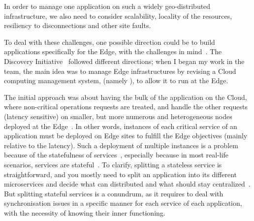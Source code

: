 In order to manage one application on such a widely geo-distributed
infrastructure, we also need to consider scalability, locality of the
resources, resiliency to disconnections and other site faults.


To deal with these challenges, one possible direction could be to
build applications specifically for the Edge, with the challenges in
mind~\cite{DMVM18, CSFN19}.
%
The Discovery Initiative~\cite{discovery} followed different
directions; when I began my work in the team, the main idea was to
manage Edge infrastructures by revising a Cloud computing management
system, (namely \os), to allow it to run at the Edge.
%

The initial approach was about having the bulk of the application on
the Cloud, where non-critical operations requests are treated, and
handle the other requests (latency sensitive) on smaller, but more
numerous and heterogeneous nodes deployed at the Edge~\cite{SCZLX16}.
%
In other words, instances of each critical service of an application
must be deployed on Edge sites to fulfill the Edge objectives (mainly
relative to the latency).
%
Such a deployment of multiple instances is a problem because of the
statefulness of services~\cite{Sal78, TBRT19}, especially because in
most real-life scenarios, services are stateful~\cite{BKPP+09}.
%
To clarify, splitting a stateless service is straightforward, and you
mostly need to split an application into its different
\glspl{microservice} and decide what can distributed and what should
stay centralized~\cite{TBRT19}.
%
But splitting stateful services is a conundrum, as it requires to deal
with synchronisation issues in a specific manner for each service of
each application, with the necessity of knowing their inner
functioning.
%

